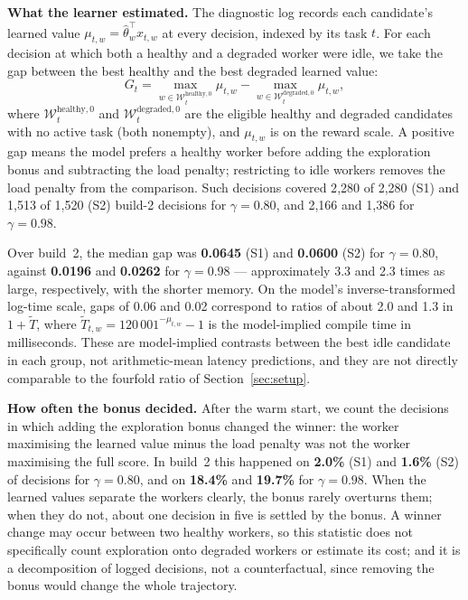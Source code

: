 \documentclass[final,5p,times,twocolumn]{elsarticle}
\begin{document}
\textbf{What the learner estimated.} The diagnostic log records each candidate's learned value $\mu_{t,w}=\hat\theta_w^\top x_{t,w}$ at every decision, indexed by its task $t$. For each decision at which both a healthy and a degraded worker were idle, we take the gap between the best healthy and the best degraded learned value:
\begin{equation}
G_t=\max_{w\in\mathcal{W}_t^{\text{healthy},0}}\mu_{t,w}-\max_{w\in\mathcal{W}_t^{\text{degraded},0}}\mu_{t,w},
\end{equation}
where $\mathcal{W}_t^{\text{healthy},0}$ and $\mathcal{W}_t^{\text{degraded},0}$ are the eligible healthy and degraded candidates with no active task (both nonempty), and $\mu_{t,w}$ is on the reward scale. A positive gap means the model prefers a healthy worker before adding the exploration bonus and subtracting the load penalty; restricting to idle workers removes the load penalty from the comparison. Such decisions covered 2{,}280 of 2{,}280 (S1) and 1{,}513 of 1{,}520 (S2) build-2 decisions for $\gamma=0.80$, and 2{,}166 and 1{,}386 for $\gamma=0.98$.

Over build~2, the median gap was \textbf{0.0645} (S1) and \textbf{0.0600} (S2) for $\gamma=0.80$, against \textbf{0.0196} and \textbf{0.0262} for $\gamma=0.98$ --- approximately 3.3 and 2.3 times as large, respectively, with the shorter memory. On the model's inverse-transformed log-time scale, gaps of 0.06 and 0.02 correspond to ratios of about 2.0 and 1.3 in $1+\widetilde{T}$, where $\widetilde{T}_{t,w}=120\,001^{-\mu_{t,w}}-1$ is the model-implied compile time in milliseconds. These are model-implied contrasts between the best idle candidate in each group, not arithmetic-mean latency predictions, and they are not directly comparable to the fourfold ratio of Section~\ref{sec:setup}.

\textbf{How often the bonus decided.} After the warm start, we count the decisions in which adding the exploration bonus changed the winner: the worker maximising the learned value minus the load penalty was not the worker maximising the full score. In build~2 this happened on \textbf{2.0\%} (S1) and \textbf{1.6\%} (S2) of decisions for $\gamma=0.80$, and on \textbf{18.4\%} and \textbf{19.7\%} for $\gamma=0.98$. When the learned values separate the workers clearly, the bonus rarely overturns them; when they do not, about one decision in five is settled by the bonus. A winner change may occur between two healthy workers, so this statistic does not specifically count exploration onto degraded workers or estimate its cost; and it is a decomposition of logged decisions, not a counterfactual, since removing the bonus would change the whole trajectory.
\end{document}
